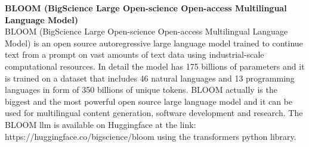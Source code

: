 \textbf{BLOOM (BigScience Large Open-science Open-access Multilingual Language Model)}\\
BLOOM (BigScience Large Open-science Open-access Multilingual Language Model) is an open source autoregressive large language model trained to continue text from a prompt on vast amounts of text data using industrial-scale computational resources. In detail the model has 175 billions of parameters and it is trained on a dataset that includes 46 natural languages and 13 programming languages in form of 350 billions of unique tokens.\cite{le2023bloom} BLOOM actually is the biggest and the most powerful open source large language model and it can be used for multilingual content generation, software development and research.\cite{exploring_bloom} The BLOOM llm is available on Huggingface at the link: https://huggingface.co/bigscience/bloom using the transformers python library.\\

